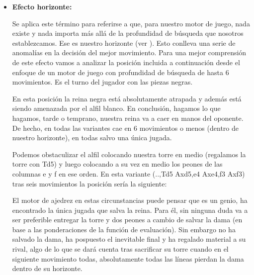 \documentclass[letterpaper,12pt]{article}
\begin{document}
\begin{itemize}
    \item \textbf{Efecto horizonte:}
    
    Se aplica este término para referirse a que, para nuestro motor de juego, nada existe
    y nada importa más allá de la profundidad de búsqueda que nosotros establezcamos. Ese
    es nuestro horizonte (ver \cite{Search6}). Esto conlleva una serie de anomalías en la
    decisión del mejor movimiento. Para una mejor comprensión de este efecto vamos a analizar
    la posición incluida a continuación desde el enfoque de un motor de juego con profundidad
    de búsqueda de hasta 6 movimientos. Es el turno del jugador con las piezas negras.
    
        \begin{center}
         \chessboard
         [
            maxfield=h8,
            startfen=a8,
            addfen=3r2k1/1Q4pp/2B5/4p3/5p2/8/PPP4p/1KR3bq,
            showmover=false
        ]   
    \end{center}
    
    En esta posición la reina negra está absolutamente atrapada y además está siendo amenazada
    por el alfil blanco. En conclusión, hagamos lo que hagamos, tarde o temprano, nuestra 
    reina va a caer en manos del oponente. De hecho, en todas las variantes cae en 6 movimientos
    o menos (dentro de nuestro horizonte), en todas salvo una única jugada.
    
    Podemos obstaculizar el alfil colocando nuestra torre en medio (regalamos la torre con Td5) 
    y luego colocando a su vez en medio los peones de las columnas e y f en ese orden. En esta
    variante (..,Td5 Axd5,e4 Axe4,f3 Axf3) tras seis movimientos la posición sería la siguiente:
    
        \begin{center}
         \chessboard
         [
            maxfield=h8,
            startfen=a8,
            addfen=6k1/1Q4pp/8/8/8/5B2/PPP4p/1KR3bq,
            showmover=false
        ]   
    \end{center}
    
    El motor de ajedrez en estas circunstancias puede pensar que es un genio, ha encontrado
    la única jugada que salva la reina. Para él, sin ninguna duda va a ser preferible entregar
    la torre y dos peones a cambio de salvar la dama (en base a las ponderaciones de la función
    de evaluación). Sin embargo no ha salvado la dama, ha pospuesto el inevitable final y ha
    regalado material a su rival, algo de lo que se dará cuenta tras sacrificar su torre cuando
    en el siguiente movimiento todas, absolutamente todas las líneas pierdan la dama dentro
    de su horizonte.
    

\end{itemize}
\end{document}
